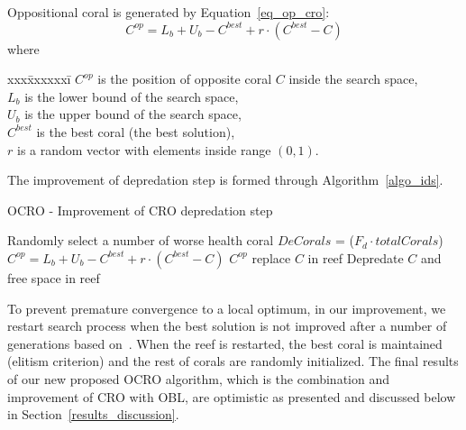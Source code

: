 \documentclass[review,3p,authoryear]{elsarticle}
\begin{document}
Oppositional coral is generated by Equation~\ref{eq_op_cro}:
\begin{equation} \label{eq_op_cro}
	C^{op} = L_b + U_b - C^{best} + r \cdot ( C^{best} - C)
\end{equation}
where 
\begin{tabbing}
	xxx\=xxxxxxi\=\kill
	\>	$C^{op}$ 		\>	is the position of opposite coral $C$ inside the search space, \\
	\>	$L_b$ 		\>	is the lower bound of the search space,	\\
	\>	$U_b$ 		\>	is the upper bound of the search space,	\\ 
	\>	$C^{best}$ 	\>	is the best coral (the best solution), 		\\
	\>	$r$ 			\>	is a random vector with elements inside range $(0,1)$. 
\end{tabbing}

The improvement of depredation step is formed through Algorithm~\ref{algo_ids}.

\begin{algorithm}
\caption{OCRO - Improvement of CRO depredation step }\label{algo_ids}
\begin{algorithmic}[1]
   \State Randomly select a number of worse health coral $DeCorals$ = ($F_{d} \cdot totalCorals$)
       \State $C^{op} = L_b + U_b - C^{best} + r \cdot ( C^{best} - C )$
           \State $C^{op}$ replace $C$ in reef
       \Else
           \State Depredate $C$ and free space in reef
       \EndIf
    \EndFor
\end{algorithmic}
\end{algorithm}

To prevent premature convergence to a local optimum, in our improvement, we restart search process when the best solution is not improved after a number of generations based on~\citep{ref_Salcedo}. When the reef is restarted, the best coral is maintained (elitism criterion) and the rest of corals are randomly initialized. The final results of our new proposed OCRO algorithm, which is the combination and improvement of CRO with OBL, are optimistic as presented and discussed below in Section~\ref{results_discussion}.
\end{document}
